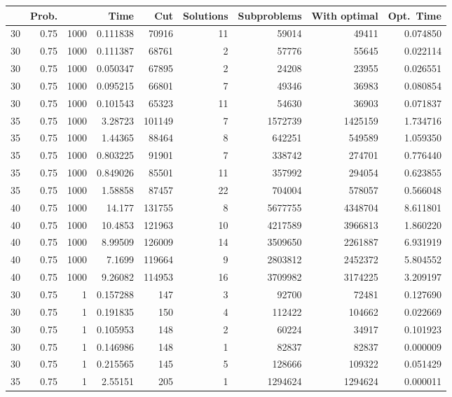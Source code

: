 \documentclass[a4paper,11pt]{article}
\begin{document}
\begin{table}
\begin{center}
\begin{tabular}{|rrr|r|r|rrr|r|}
\hline
 & Prob. &  & Time & Cut & Solutions & Subproblems & With
optimal & Opt.\ Time \\
\hline
30 & 0.75 & 1000 & 0.111838 & 70916 & 11 & 59014 & 49411 & 0.074850 \\
30 & 0.75 & 1000 & 0.111387 & 68761 & 2 & 57776 & 55645 & 0.022114 \\
30 & 0.75 & 1000 & 0.050347 & 67895 & 2 & 24208 & 23955 & 0.026551 \\
30 & 0.75 & 1000 & 0.095215 & 66801 & 7 & 49346 & 36983 & 0.080854 \\
30 & 0.75 & 1000 & 0.101543 & 65323 & 11 & 54630 & 36903 & 0.071837 \\
35 & 0.75 & 1000 & 3.28723 & 101149 & 7 & 1572739 & 1425159 & 1.734716 \\
35 & 0.75 & 1000 & 1.44365 & 88464 & 8 & 642251 & 549589 & 1.059350 \\
35 & 0.75 & 1000 & 0.803225 & 91901 & 7 & 338742 & 274701 & 0.776440 \\
35 & 0.75 & 1000 & 0.849026 & 85501 & 11 & 357992 & 294054 & 0.623855 \\
35 & 0.75 & 1000 & 1.58858 & 87457 & 22 & 704004 & 578057 & 0.566048 \\
40 & 0.75 & 1000 & 14.177 & 131755 & 8 & 5677755 & 4348704 & 8.611801 \\
40 & 0.75 & 1000 & 10.4853 & 121963 & 10 & 4217589 & 3966813 & 1.860220 \\
40 & 0.75 & 1000 & 8.99509 & 126009 & 14 & 3509650 & 2261887 & 6.931919 \\
40 & 0.75 & 1000 & 7.1699 & 119664 & 9 & 2803812 & 2452372 & 5.804552 \\
40 & 0.75 & 1000 & 9.26082 & 114953 & 16 & 3709982 & 3174225 & 3.209197 \\
\hline
30 & 0.75 & 1 & 0.157288 & 147 & 3 & 92700 & 72481 & 0.127690 \\
30 & 0.75 & 1 & 0.191835 & 150 & 4 & 112422 & 104662 & 0.022669 \\
30 & 0.75 & 1 & 0.105953 & 148 & 2 & 60224 & 34917 & 0.101923 \\
30 & 0.75 & 1 & 0.146986 & 148 & 1 & 82837 & 82837 & 0.000009 \\
30 & 0.75 & 1 & 0.215565 & 145 & 5 & 128666 & 109322 & 0.051429 \\
35 & 0.75 & 1 & 2.55151 & 205 & 1 & 1294624 & 1294624 & 0.000011 \\

\end{tabular}
\end{center}
\end{table}
\end{document}
